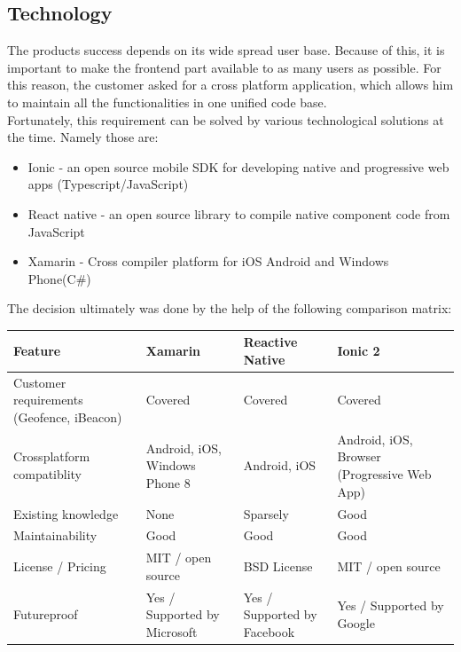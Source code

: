 \documentclass[11pt]{article} %
\begin{document}
\subsection{Technology}
The products success depends on its wide spread user base. Because of this, it is important to make the frontend part available to as many users as possible. For this reason, the customer asked for a cross platform application, which allows him to maintain all the functionalities in one unified code base.\\
Fortunately, this requirement can be solved by various technological solutions at the time. Namely those are:

\begin{itemize}
  \item Ionic\cite{ionic} - an open source mobile SDK for developing native and progressive web apps (Typescript/JavaScript)
  \item React native\cite{react-native} - an open source library to compile native component code from JavaScript
  \item Xamarin\cite{xamarin} - Cross compiler platform for iOS Android and Windows Phone(C\#)
\end{itemize}

The decision ultimately was done by the help of the following comparison matrix:

\vspace{0.5cm}

\begin{tabulary}{\linewidth}{LLLL}
    \hline
    Feature&Xamarin\cite{xamarin}&Reactive Native\cite{react-native}&Ionic 2\cite{ionic2}\\
    \hline
	Customer requirements (Geofence, iBeacon)&Covered&Covered&Covered\\
	Crossplatform compatiblity&Android, iOS, Windows Phone 8&Android, iOS&Android, iOS, Browser (Progressive Web App)\\
	Existing knowledge&None&Sparsely&Good\\
	Maintainability&Good&Good&Good\\
	License / Pricing&MIT / open source&BSD License&MIT / open source\\
	Futureproof&Yes / Supported by Microsoft&Yes / Supported by Facebook&Yes / Supported by Google\\
    \hline
\end{tabulary} 

\vspace{0.5cm}
\end{document}
